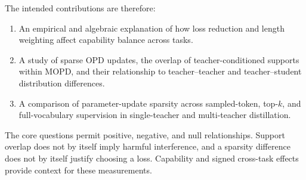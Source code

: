 The intended contributions are therefore:
\begin{enumerate}
\item An empirical and algebraic explanation of how loss reduction
and length weighting affect capability balance across tasks.
\item A study of sparse OPD updates, the overlap of teacher-conditioned
supports within MOPD, and their relationship to teacher--teacher and
teacher--student distribution differences.
\item A comparison of parameter-update sparsity across sampled-token, top-$k$, and full-vocabulary supervision in
single-teacher and multi-teacher distillation.
\end{enumerate}

The core questions permit positive, negative, and null relationships.
Support overlap does not by itself imply harmful interference, and a
sparsity difference does not by itself justify choosing a loss. Capability
and signed cross-task effects provide context for these measurements.
